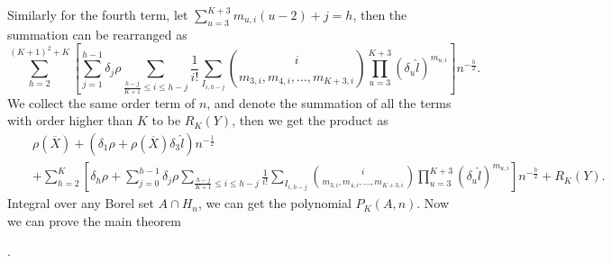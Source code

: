 \documentclass[oneside,english]{amsbook}
\numberwithin{section}{chapter}
\numberwithin{equation}{section}
\numberwithin{figure}{section}
\theoremstyle{plain}
\theoremstyle{plain}
\theoremstyle{definition}
\theoremstyle{plain}
\theoremstyle{plain}
\theoremstyle{remark}
\theoremstyle{definition}
\theoremstyle{definition}
\begin{document}
Similarly for the fourth term, let $\sum_{u=3}^{K+3}m_{u,i}\left(u-2\right)+j=h$,
then the summation can be rearranged as 
\[
\sum_{h=2}^{\left(K+1\right)^{2}+K}\left[\sum_{j=1}^{h-1}\delta_{j}\rho\sum_{\frac{h-j}{K+1}\le i\le h-j}\frac{1}{i!}\sum_{I_{i,h-j}}\binom{i}{m_{3,i},m_{4,i},\ldots,m_{K+3,i}}\prod_{u=3}^{K+3}\left(\delta_{u}\hat{l}\right)^{m_{u,i}}\right]n^{-\frac{h}{2}}.
\]
We collect the same order term of $n$, and denote the summation of
all the terms with order higher than $K$ to be $R_{K}\left(Y\right)$,
then we get the product as 
\begin{eqnarray*}
 &  & \rho\left(\overline{X}\right)+\left(\delta_{1}\rho+\rho\left(\overline{X}\right)\delta_{3}\hat{l}\right)n^{-\frac{1}{2}}\\
 &  & +\sum_{h=2}^{K}\left[\delta_{h}\rho+\sum_{j=0}^{h-1}\delta_{j}\rho\sum_{\frac{h-j}{K+1}\le i\le h-j}\frac{1}{i!}\sum_{I_{i,h-j}}\binom{i}{m_{3,i},m_{4,i},\ldots,m_{K+3,i}}\prod_{u=3}^{K+3}\left(\delta_{u}\hat{l}\right)^{m_{u,i}}\right]n^{-\frac{h}{2}}+R_{K}\left(Y\right).
\end{eqnarray*}
 Integral over any Borel set $A\cap H_{n}$, we can get the polynomial
$P_{K}\left(A,n\right)$. Now we can prove the main theorem %

. 
\end{document}
